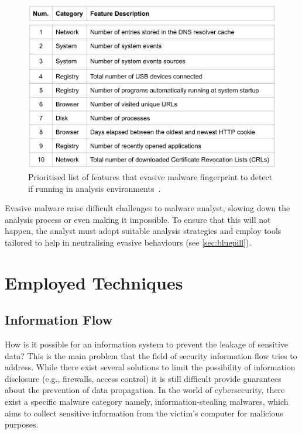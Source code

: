 \documentclass[LaM,binding=0.6cm]{sapthesis}
\begin{document}
\begin{figure}[h!]
\centering
\includegraphics[scale=.5]{images/background5}
\caption{Prioritised list of features that evasive malware fingerprint to detect if running in analysis environments~\cite{miramirkhani2017spotless}.}
\end{figure}
Evasive malware raise difficult challenges to malware analyst, slowing down the analysis process or even making it impossible. To ensure that this will not happen, the analyst must adopt suitable analysis strategies and employ tools tailored to help in neutralising evasive behaviours (see \autoref{sec:bluepill}).

\chapter{Employed Techniques}
\label{ch:chapter2}

\section{Information Flow}
\label{sec:informationflow}
How is it possible for an information system to prevent the leakage of sensitive data? This is the main problem that the field of security information flow tries to address. While there exist several solutions to limit the possibility of information disclosure (e.g., firewalls, access control) it is still difficult provide guarantees about the prevention of data propagation. In the world of cybersecurity, there exist a specific malware category namely, information-stealing malwares, which aims to collect sensitive information from the victim's computer for malicious purposes.\\
\end{document}
